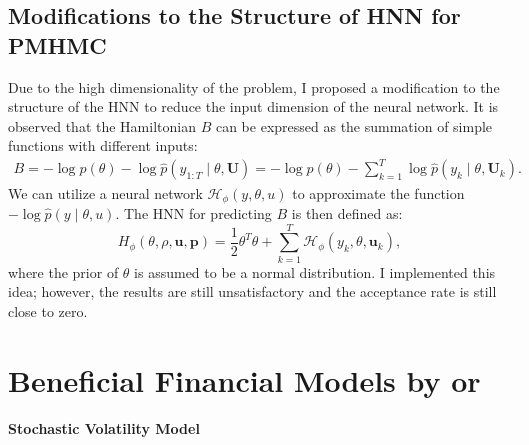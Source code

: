 \documentclass[11pt,a4paper]{article}
\theoremstyle{remark}
\begin{document}
\subsection{Modifications to the Structure of HNN for PMHMC} 
Due to the high dimensionality of the problem, I proposed a modification to the structure of the HNN to reduce the input dimension of the neural network. It is observed that the Hamiltonian $B$ can be expressed as the summation of simple functions with different inputs:
\begin{align}
    B = -\log p(\theta) - \log \hat{p}(y_{1:T} \mid \theta, \mathbf{U}) = -\log p(\theta) - \sum_{k=1}^T \log \hat{p}(y_k \mid \theta, \mathbf{U}_k).
\end{align}
We can utilize a neural network $\mathcal{H}_\phi (y, \theta, u)$ to approximate the function $-\log \hat{p}(y \mid \theta, u)$. The HNN for predicting $B$ is then defined as:
\[
H_\phi (\theta, \rho, \mathbf{u}, \mathbf{p}) = \frac{1}{2} \theta^T \theta + \sum_{k=1}^T \mathcal{H}_\phi (y_k, \theta, \mathbf{u}_k),
\]
where the prior of $\theta$ is assumed to be a normal distribution. I implemented this idea; however, the results are still unsatisfactory and the acceptance rate is still close to zero.


\section{Beneficial Financial Models by \cite{alenlov2021pseudo} or \cite{dhulipala2023efficient}}
\label{sec:models}
\smallskip
\noindent \textbf{Stochastic Volatility Model} 
\end{document}
